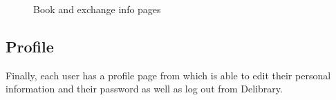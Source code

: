\begin{figure}[H]
{      }
      \caption{Book and exchange info pages}
\end{figure}

\subsection{Profile}
Finally, each user has a profile page from which is able to edit their personal information and their password as well as log out from Delibrary.

